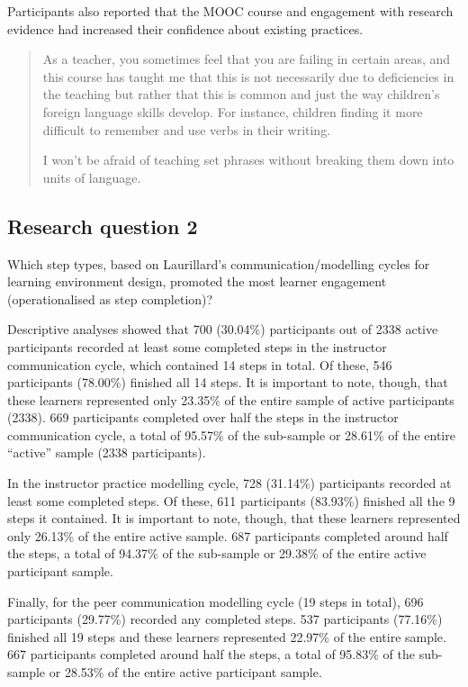 \documentclass[output=paper]{langscibook}
\begin{document}
Participants also reported that the MOOC course and engagement with research evidence had increased their confidence about existing practices.

\begin{quote}
As a teacher, you sometimes feel that you are failing in certain areas, and this course has taught me that this is not necessarily due to deficiencies in the teaching but rather that this is common and just the way children's foreign language skills develop. For instance, children finding it more difficult to remember and use verbs in their writing.

I won't be afraid of teaching set phrases without breaking them down into units of language.
\end{quote}

\subsection{Research question 2}\label{sec:porter:3.2}

Which step types, based on Laurillard’s communication/modelling cycles for learning environment design, promoted the most learner engagement (operationalised as step completion)?

Descriptive analyses showed that 700 (30.04\%) participants out of 2338 active participants recorded at least some completed steps in the instructor communication cycle, which contained 14 steps in total. Of these, 546 participants (78.00\%) finished all 14 steps. It is important to note, though, that these learners represented only 23.35\% of the entire sample of active participants (2338). 669 participants completed over half the steps in the instructor communication cycle, a total of 95.57\% of the sub-sample or 28.61\% of the entire ``active'' sample (2338 participants). 

In the instructor practice modelling cycle, 728 (31.14\%) participants recorded at least some completed steps. Of these, 611 participants (83.93\%) finished all the 9 steps it contained. It is important to note, though, that these learners represented only 26.13\% of the entire active sample. 687 participants completed around half the steps, a total of 94.37\% of the sub-sample or 29.38\% of the entire active participant sample. 

Finally, for the peer communication modelling cycle (19 steps in total), 696 participants (29.77\%)  recorded any completed steps. 537 participants (77.16\%) finished all 19 steps and these learners represented 22.97\% of the entire sample.  667 participants completed around half the steps, a total of 95.83\% of the sub-sample or 28.53\% of the entire active participant sample. 
\end{document}
